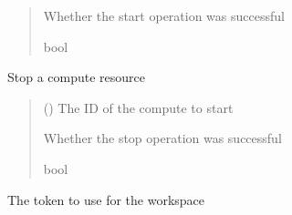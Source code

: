 \documentclass[letterpaper,10pt,english]{sphinxmanual}
\begin{document}
\begin{fulllineitems}
\begin{fulllineitems}
\begin{quote}
\begin{description}
\sphinxAtStartPar
{} \textendash{} Whether the start operation was successful

\sphinxAtStartPar
bool

\end{description}\end{quote}

\end{fulllineitems}


\begin{fulllineitems}
\label{\detokenize{aisquared.platform:aisquared.platform.DatabricksClient.DatabricksClient.stop_compute}}
\pysigstartsignatures
{}
\pysigstopsignatures
\sphinxAtStartPar
Stop a compute resource
\begin{quote}\begin{description}
\sphinxAtStartPar
{} () \textendash{} The ID of the compute to start

\sphinxAtStartPar
{} \textendash{} Whether the stop operation was successful

\sphinxAtStartPar
bool

\end{description}\end{quote}

\end{fulllineitems}


\begin{fulllineitems}
\label{\detokenize{aisquared.platform:aisquared.platform.DatabricksClient.DatabricksClient.token}}
\pysigstartsignatures
{}
\pysigstopsignatures
\sphinxAtStartPar
The token to use for the workspace


\end{fulllineitems}
\end{fulllineitems}
\end{document}
